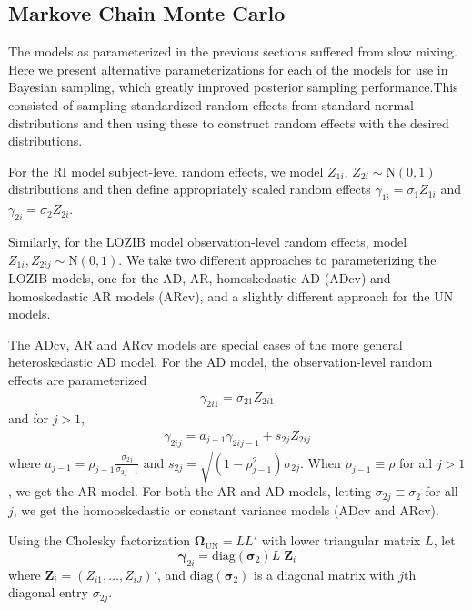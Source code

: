 \documentclass[12pt]{article}
\begin{document}
\subsection{Markove Chain Monte Carlo}

The models as parameterized in the previous sections suffered from slow mixing. Here we present alternative parameterizations for each of the models for use in Bayesian sampling, which greatly improved posterior sampling performance.This consisted of sampling standardized random effects from standard normal distributions and then using these to construct random effects with the desired distributions.

For the RI model subject-level random effects, we model $Z_{1i}$, $Z_{2i} \sim \text{N}(0,1)$ distributions and then define appropriately scaled random effects $\gamma_{1i} = \sigma_{1}Z_{1i}$ and $\gamma_{2i}=\sigma_{2}Z_{2i}$. 

Similarly, for the LOZIB model observation-level random effects, model $Z_{1i}, Z_{2ij} \sim $N$(0,1)$. We take two different approaches to parameterizing the LOZIB models, one for the AD, AR, homoskedastic AD (ADcv) and homoskedastic AR models (ARcv), and a slightly different approach for the UN models.

The ADcv, AR and ARcv models are special cases of the more general heteroskedastic AD model. For the AD model, the observation-level random effects are parameterized
\begin{align}
	\gamma_{2i1} = \sigma_{21} Z_{2i1}
\end{align}
and for $j>1$,
\begin{align}
	\gamma_{2ij} = a_{j-1} \gamma_{2ij-1} + s_{2j} Z_{2ij}
\end{align}
where $a_{j-1} = \rho_{j-1} \frac{\sigma_{2j}}{\sigma_{2j-1}}$ and $s_{2j} = \sqrt{(1 - \rho_{j-1}^{2})}\sigma_{2j}$. When $\rho_{j-1} \equiv \rho$ for all $j>1$, we get the AR model. For both the AR and AD models, letting $\sigma_{2j} \equiv \sigma_{2}$ for all $j$, we get the homooskedastic or constant variance models (ADcv and ARcv).

Using the Cholesky factorization $\bm{\Omega}_{\text{UN}} = LL'$ with lower triangular matrix $L$, let
\begin{equation}
	\bm{\gamma}_{2i} = \text{diag}(\bm{\sigma}_{2}) L\; \bm{Z}_{i}
\end{equation}
where $\bm{Z}_{i} = (Z_{i1}, \dots, Z_{iJ})'$, and $\text{diag}(\bm{\sigma}_{2})$ is a diagonal matrix with $j$th diagonal entry $\sigma_{2j}$.
\end{document}
